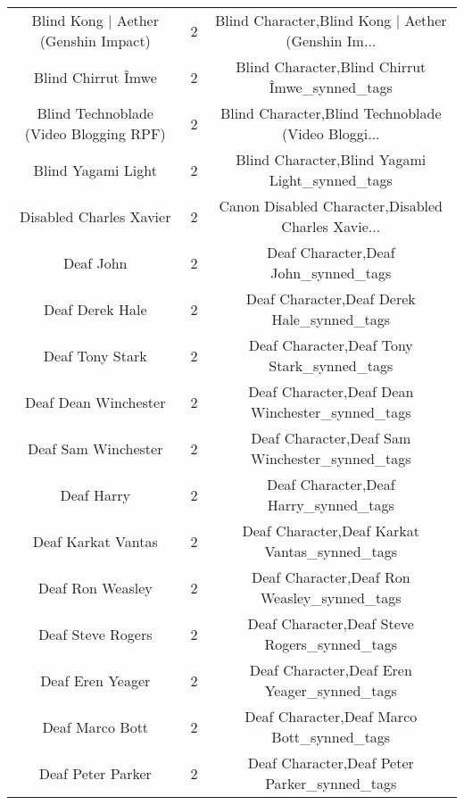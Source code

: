 \begin{table}[h!]
{\begin{tabular}{|c|c|c|}
              Blind Kong | Aether (Genshin Impact) &          2 & Blind Character,Blind Kong | Aether (Genshin Im... \\
                                Blind Chirrut Îmwe &          2 &     Blind Character,Blind Chirrut Îmwe\_synned\_tags \\
            Blind Technoblade (Video Blogging RPF) &          2 & Blind Character,Blind Technoblade (Video Bloggi... \\
                                Blind Yagami Light &          2 &     Blind Character,Blind Yagami Light\_synned\_tags \\
                           Disabled Charles Xavier &          2 & Canon Disabled Character,Disabled Charles Xavie... \\
                                         Deaf John &          2 &               Deaf Character,Deaf John\_synned\_tags \\
                                   Deaf Derek Hale &          2 &         Deaf Character,Deaf Derek Hale\_synned\_tags \\
                                   Deaf Tony Stark &          2 &         Deaf Character,Deaf Tony Stark\_synned\_tags \\
                              Deaf Dean Winchester &          2 &    Deaf Character,Deaf Dean Winchester\_synned\_tags \\
                               Deaf Sam Winchester &          2 &     Deaf Character,Deaf Sam Winchester\_synned\_tags \\
                                        Deaf Harry &          2 &              Deaf Character,Deaf Harry\_synned\_tags \\
                                Deaf Karkat Vantas &          2 &      Deaf Character,Deaf Karkat Vantas\_synned\_tags \\
                                  Deaf Ron Weasley &          2 &        Deaf Character,Deaf Ron Weasley\_synned\_tags \\
                                 Deaf Steve Rogers &          2 &       Deaf Character,Deaf Steve Rogers\_synned\_tags \\
                                  Deaf Eren Yeager &          2 &        Deaf Character,Deaf Eren Yeager\_synned\_tags \\
                                   Deaf Marco Bott &          2 &         Deaf Character,Deaf Marco Bott\_synned\_tags \\
                                 Deaf Peter Parker &          2 &       Deaf Character,Deaf Peter Parker\_synned\_tags \\

\end{tabular}}
\end{table}
